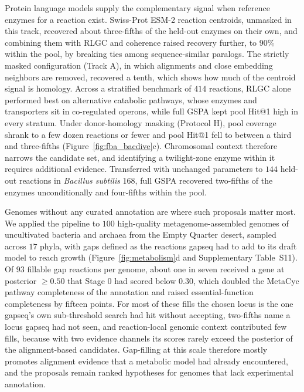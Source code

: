 \documentclass[10pt,twocolumn]{article}
\begin{document}
Protein language models supply the complementary signal when reference enzymes for a reaction exist. Swiss-Prot ESM-2 reaction centroids, unmasked in this track, recovered about three-fifths of the held-out enzymes on their own, and combining them with RLGC and coherence raised recovery further, to $90\%$ within the pool, by breaking ties among sequence-similar paralogs. The strictly masked configuration (Track A), in which alignments and close embedding neighbors are removed, recovered a tenth, which shows how much of the centroid signal is homology. Across a stratified benchmark of $414$ reactions, RLGC alone performed best on alternative catabolic pathways, whose enzymes and transporters sit in co-regulated operons, while full GSPA kept pool Hit@1 high in every stratum. Under donor-homology masking (Protocol H), pool coverage shrank to a few dozen reactions or fewer and pool Hit@1 fell to between a third and three-fifths (Figure~\ref{fig:fba_bacdive}c). Chromosomal context therefore narrows the candidate set, and identifying a twilight-zone enzyme within it requires additional evidence. Transferred with unchanged parameters to $144$ held-out reactions in \textit{Bacillus subtilis} 168, full GSPA recovered two-fifths of the enzymes unconditionally and four-fifths within the pool.

Genomes without any curated annotation are where such proposals matter most. We applied the pipeline to $100$ high-quality metagenome-assembled genomes of uncultivated bacteria and archaea from the Empty Quarter desert, sampled across $17$ phyla, with gaps defined as the reactions gapseq had to add to its draft model to reach growth (Figure~\ref{fig:metabolism}d and Supplementary Table~S11). Of $93$ fillable gap reactions per genome, about one in seven received a gene at posterior $\ge 0.50$ that Stage 0 had scored below $0.30$, which doubled the MetaCyc pathway completeness of the annotation and raised essential-function completeness by fifteen points. For most of these fills the chosen locus is the one gapseq's own sub-threshold search had hit without accepting, two-fifths name a locus gapseq had not seen, and reaction-local genomic context contributed few fills, because with two evidence channels its scores rarely exceed the posterior of the alignment-based candidates. Gap-filling at this scale therefore mostly promotes alignment evidence that a metabolic model had already encountered, and the proposals remain ranked hypotheses for genomes that lack experimental annotation.
\end{document}
